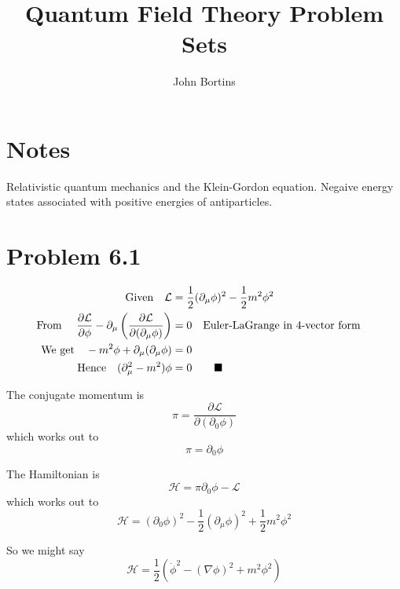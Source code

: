 \documentclass{article}
\title{Quantum Field Theory Problem Sets}
\author{John Bortins}
\begin{document}
 
\maketitle{}

\section*{Notes}

Relativistic quantum mechanics and the Klein-Gordon equation. Negaive energy states associated with positive energies of antiparticles.
 
\section*{Problem 6.1}

\begin{align*}
\qq*{Given}\mathcal{L}&=\frac{1}{2}(\partial_\mu \phi)^2 - \frac{1}{2} m^2 \phi^2\\
\qq*{From }\frac{\partial \mathcal{L}}{\partial \phi}-\partial_\mu  \left(\frac{\partial \mathcal{L}}{\partial (\partial_\mu \phi)}\right) &= 0 \qq{Euler-LaGrange in 4-vector form}\\
\qq*{We get}-m^2 \phi + \partial_\mu (\partial_\mu \phi)&= 0\\
\qq*{Hence}(\partial^2_\mu-m^2) \phi&=0\qquad\blacksquare
\end{align*}
 
The conjugate momentum is \[\pi=\frac{\partial \mathcal{L}}{\partial (\partial_0 \phi)}\] which works out to
\[\pi=\partial_0 \phi\]

The Hamiltonian is \[\mathcal{H}=\pi \partial_0 \phi - \mathcal{L}\] which works out to
\[\mathcal{H}=(\partial_0 \phi)^2-\frac{1}{2}(\partial_\mu \phi)^2 + \frac{1}{2} m^2 \phi^2\]

So we might say \[\mathcal{H}=\frac{1}{2}(\dot{\phi}^2-(\nabla  \phi)^2 +  m^2 \phi^2)\]
\end{document}
